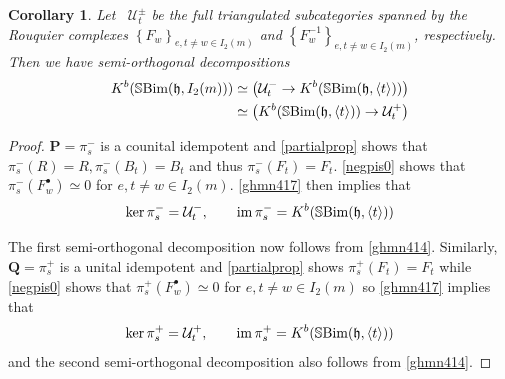 \documentclass[10pt]{article}
\numberwithin{theorem}{section}
\newtheorem{corollary}[theorem]{Corollary}
\theoremstyle{definition}
\newcommand{\im}{\mathrm{im } \,}
\newcommand{\Uc}{\mathcal{U}}
\newcommand{\hf}{\mathfrak{h}}
\newcommand{\sbim}{\mathbb{S}\textnormal{Bim}}
\newcommand{\abrac}[1]{\left\langle#1\right\rangle}
\newcommand{\paren}[1]{\left( #1 \right)}
\newcommand{\set}[1]{\left \{ #1 \right \}}
\newcommand{\0}{\ \raisebox{-2ex}{\begin{tikzpicture}[xscale=0.25,yscale=0.3,thick,baseline]
 \draw (0,0) -- (0,3); 
\end{tikzpicture}}}
\renewcommand{\1}{\ \raisebox{-2ex}{\begin{tikzpicture}[xscale=0.25,yscale=0.3,thick,baseline]
 \draw (0,0) -- (0,1);
 \draw (0,2) -- (0,3);
 \node[dot] at (0,1) {};
  \node[dot] at (0,2) {};
\end{tikzpicture}}}
\begin{document}
\begin{corollary}
\label{semicor}
    Let \, $\Uc_t^{\pm}$ be the full triangulated subcategories spanned by the Rouquier complexes $\set{F_w}_{e,t\neq w\in I_2(m)}$ and $\set{F_w^{-1}}_{e,t\neq w\in I_2(m)}$, respectively. Then we have semi-orthogonal decompositions
    \begin{align*}
       K^b( \sbim(\hf, I_2(m) )) & \simeq \paren{ \Uc_t^{-} \to K^b( \sbim(\hf, \abrac{t} ))  } \\
       & \simeq \paren{  K^b( \sbim(\hf, \abrac{t} ))\to \Uc_t^{+}   }
    \end{align*}
\end{corollary}
\begin{proof}
 $\mathbf{P}=\pi^-_s$ is a counital idempotent and \cref{partialprop} shows that $\pi^-_s(R)=R, \pi^-_s(B_t)=B_t$ and thus $\pi^-_s(F_t)=F_t$. \cref{negpis0} shows that $\pi^-_s(F^\bullet_w)\simeq 0$ for $e,t\neq w\in I_2(m)$. \cref{ghmn417} then implies 
 that
 \begin{equation}
 \label{kerpieq}
     \ker \pi^-_s=\Uc^-_t, \qquad \im \pi^-_s=K^b( \sbim(\hf, \abrac{t} ))
 \end{equation}
 
 The first semi-orthogonal decomposition now follows from \cref{ghmn414}. Similarly, $\mathbf{Q}=\pi^+_s$ is a unital idempotent and \cref{partialprop} shows $\pi^+_s(F_t)=F_t$ while \cref{negpis0} shows that $\pi^+_s(F^\bullet_w)\simeq 0$ for $e,t\neq w\in I_2(m)$ so \cref{ghmn417} implies that
  \begin{equation}
     \ker \pi^+_s=\Uc^+_t, \qquad \im \pi^+_s=K^b( \sbim(\hf, \abrac{t} ))
 \end{equation}
 and the second semi-orthogonal decomposition also follows from \cref{ghmn414}.
\end{proof}
\end{document}
